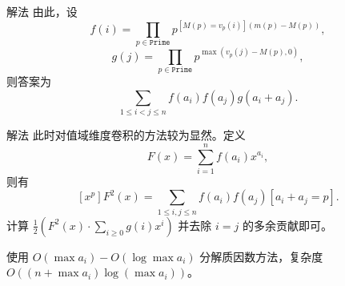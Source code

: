 \documentclass{beamer}
\begin{document}
\begin{frame}{解法}
	由此，设 $$f(i) = \prod_{p \in \texttt{Prime}} p^{[M(p) = v_p(i)](m(p) - M(p))},$$ $$g(j) = \prod_{p \in \texttt{Prime}} p^{\max(v_p(j) - M(p) , 0)},$$则答案为 $$\sum_{1 \le i < j \le n} f(a_i)f(a_j)g(a_i+a_j).$$
\end{frame}
\begin{frame}{解法}
	此时对值域维度卷积的方法较为显然。定义 
	$$F(x) = \sum_{i=1}^n f(a_i) x^{a_i},$$ 则有 $$[x^p]F^2(x) = \sum_{1 \le i,j \le n} f(a_i)f(a_j)[a_i+a_j = p].$$
	计算 $\frac{1}{2} \left(F^2(x) \cdot \sum_{i \ge 0} g(i) x^i \right)$ 并去除 $i=j$ 的多余贡献即可。

	使用 $O(\max a_i) - O(\log \max a_i)$ 分解质因数方法，复杂度 $O((n + \max a_i) \log (\max a_i))$。
\end{frame}
\end{document}
